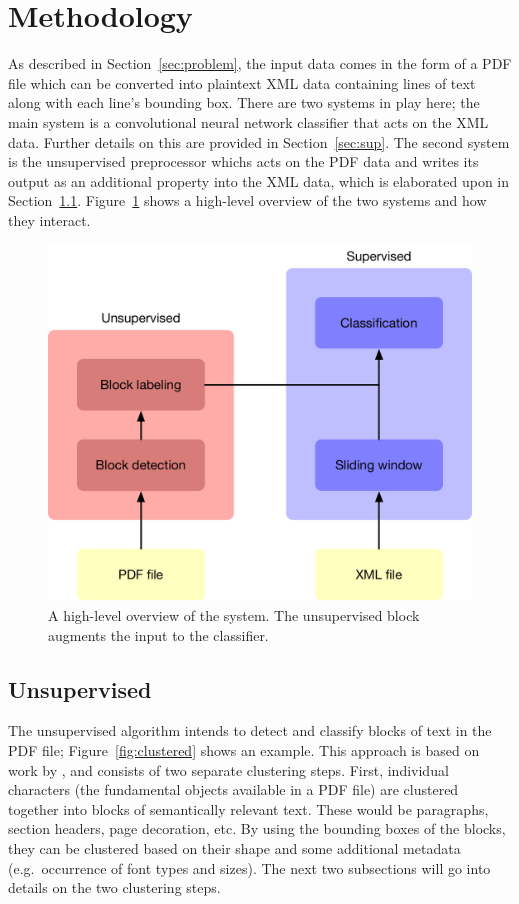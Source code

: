 \section{Methodology}%
\label{sec:method}

As described in Section~\ref{sec:problem}, the input data comes in the form of a
PDF file which can be converted into plaintext XML data containing lines of text
along with each line's bounding box. There are two systems in play here; the
main system is a convolutional neural network classifier that acts on the XML
data. Further details on this are provided in Section~\ref{sec:sup}. The second
system is the unsupervised preprocessor whichs acts on the PDF data and writes
its output as an additional property into the XML data, which is elaborated upon
in Section~\ref{sec:unsup}. Figure~\ref{fig:overview} shows a high-level
overview of the two systems and how they interact.

\begin{figure}[htb]
  \centering
  \includegraphics[width=\textwidth]{figures/layout.pdf}
  \caption{A high-level overview of the system. The unsupervised block augments
  the input to the classifier.}%
  \label{fig:overview}
\end{figure}

\subsection{Unsupervised}%
\label{sec:unsup}
The unsupervised algorithm intends to detect and classify blocks of text in the
PDF file; Figure~\ref{fig:clustered} shows an example. This approach is based on
work by \textcite{klampfl2014unsupervised}, and consists of two separate
clustering steps. First, individual characters (the fundamental objects
available in a PDF file) are clustered together into blocks of semantically
relevant text. These would be paragraphs, section headers, page decoration, etc.
By using the bounding boxes of the blocks, they can be clustered based on their
shape and some additional metadata (e.g.\ occurrence of font types and sizes).
The next two subsections will go into details on the two clustering steps.

